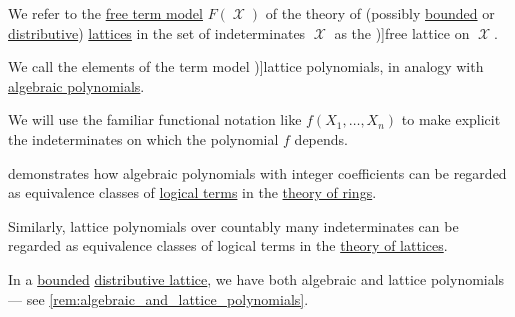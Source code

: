 \begin{definition}\label{def:free_lattice}\mimprovised
  We refer to the \hyperref[def:fol_free_term_model]{free term model} \( F(\mscrX) \) of the theory of (possibly \hyperref[def:bounded_lattice]{bounded} or \hyperref[def:distributive_lattice]{distributive}) \hyperref[def:lattice]{lattices} in the set of indeterminates \( \mscrX \) as the \term[en=free lattice (\cite[36]{Birkhoff1967LatticeTheory})]{free lattice} on \( \mscrX \).

  \begin{thmenum}
     We call the elements of the term model \term[en=lattice polynomial (\cite[29]{Birkhoff1967LatticeTheory})]{lattice polynomials}, in analogy with \hyperref[def:polynomial_algebra/polynomials]{algebraic polynomials}.

    We will use the familiar functional notation like \( f(X_1, \ldots, X_n) \) to make explicit the indeterminates on which the polynomial \( f \) depends.
  \end{thmenum}
\end{definition}
\begin{comments}
  \item {} demonstrates how algebraic polynomials with integer coefficients can be regarded as equivalence classes of \hyperref[def:fol_term]{logical terms} in the \hyperref[def:ring/theory]{theory of rings}.

  Similarly, lattice polynomials over countably many indeterminates can be regarded as equivalence classes of logical terms in the \hyperref[def:lattice/theory]{theory of lattices}.

  \item In a \hyperref[def:extremal_points/bounds]{bounded} \hyperref[def:distributive_lattice]{distributive lattice}, we have both algebraic and lattice polynomials --- see \cref{rem:algebraic_and_lattice_polynomials}.
\end{comments}

